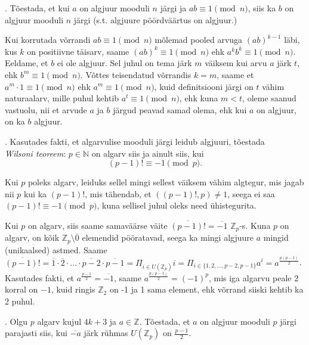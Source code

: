 \documentclass[a4paper, 10pt]{article}
\newcommand{\Z}{\mathbb{Z}}
\newcommand{\N}{\mathbb{N}}
\newcommand{\w}{\overline}
\begin{document}
\bigskip

. T\~oestada, et kui $a$ on algjuur mooduli $n$ j\"argi ja $ab\equiv 1\pmod{n}$, siis ka $b$ on algjuur mooduli $n$ j\"argi (s.t. algjuure pöördväärtus on algjuur.)

\bigskip
Kui korrutada võrrandi $ab\equiv1\pmod n$ mõlemad pooled arvuga $(ab)^{k-1}$ läbi, kus $k$ on positiivne täisarv, saame $(ab)^k\equiv1\pmod n$ ehk $a^kb^k\equiv1\pmod n$. Eeldame, et $b$ ei ole algjuur. Sel juhul on tema järk $m$ väiksem kui arvu $a$ järk $t$, ehk $b^m\equiv1\pmod n$. Võttes teisendatud võrrandis $k=m$, saame et $a^m\cdot1\equiv1\pmod n$ ehk $a^m\equiv1\pmod n$, kuid definitsiooni järgi on $t$ vähim naturaalarv, mille puhul kehtib $a^t\equiv1\pmod n$, ehk kuna $m<t$, oleme saanud vastuolu, nii et arvude $a$ ja $b$ järgud peavad samad olema, ehk kui $a$ on algjuur, on ka $b$ algjuur.
\bigskip
\pagebreak

. Kasutades fakti, et algarvulise mooduli järgi leidub algjuuri, tõestada \\\emph{Wilsoni teoreem}:
$p\in\N$ on algarv siis ja ainult siis, kui 
$$
(p-1)!\equiv -1 \pmod{p}.
$$

\smallskip
Kui $p$ poleks algarv, leiduks sellel mingi sellest väiksem vähim algtegur, mis jagab nii $p$ kui ka $(p-1)!$, mis tähendab, et $((p-1)!,p)\neq 1$, seega ei saa $(p-1)!\equiv -1 \pmod{p}$, kuna sellisel juhul oleks need ühistegurita. 

Kui $p$ on algarv, siis saame samaväärse väite $\w{(p-1)!}=\w{-1}$ $\Z_p$-s. Kuna $p$ on algarv, on kõik $\Z_p\setminus \w{0}$ elemendid pööratavad, seega ka mingi algjuure $a$ mingid (unikaalsed) astmed. Saame $\w{(p-1)!}=\w{1}\cdot \w{2}\cdot ...\cdot \w{p-2}\cdot \w{p-1}=\Pi_{i \in U(\Z_p)}i=\Pi_{i \in \{1,2,...,p-2,p-1\}} a^i=a^{\frac{p(p-1)}{2}} $. Kasutades fakti, et $a^{\frac{p-1}{2}}=\w{-1}$, saame $a^{\frac{p(p-1)}{2}}=(-1)^p $, mis iga algarvu peale 2 korral on $-1$, kuid ringis $\Z_2$ on -1 ja 1 sama element, ehk võrrand siiski kehtib ka 2 puhul.

\bigskip

. Olgu $p$ algarv kujul $4k+3$ ja $a\in\Z$. Tõestada, et $a$ on algjuur mooduli $p$ järgi parajasti siis, kui $\overline{-a}$ järk rühmas  $U(\Z_p)$ on $\frac{p-1}{2}$. 
\end{document}
